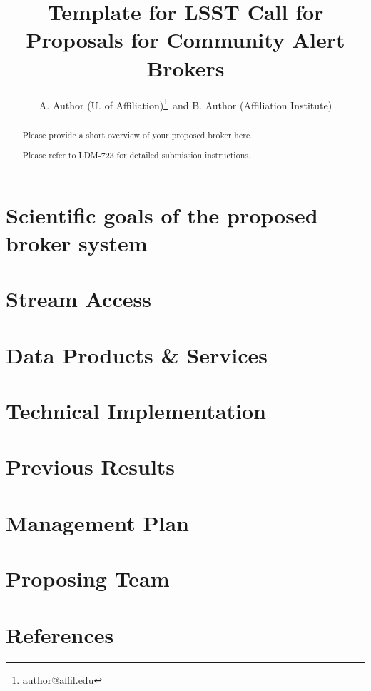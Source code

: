 \documentclass[11pt, letterpaper]{article}
\title{Template for LSST Call for Proposals for Community Alert Brokers}
\author{A. Author (U. of Affiliation)\footnote{author@affil.edu}\ and B. Author (Affiliation Institute)}
\date{}
\begin{document}
\maketitle

\begin{abstract}
Please provide a short overview of your proposed broker here.

Please refer to LDM-723 for detailed submission instructions.
\end{abstract}


\section{Scientific goals of the proposed broker system}

\section{Stream Access}

\section{Data Products \& Services}


\section{Technical Implementation}

\section{Previous Results}

\section{Management Plan}

\section{Proposing Team}

\section{References}
\end{document}
